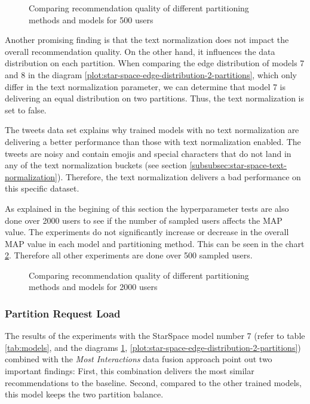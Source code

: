 \begin{figure}[!htb]
    \centering
    
    \caption{Comparing recommendation quality of different partitioning methods and models for 500 users}
    \label{plot:hyperparameter-recommendation-quality}
\end{figure}


Another promising finding is that the text normalization does not impact the overall recommendation quality. On the other hand, it influences the data distribution on each partition. When comparing the edge distribution of models 7 and 8 in the diagram \ref{plot:star-space-edge-distribution-2-partitions}, which only differ in the text normalization parameter, we can determine that model 7 is delivering an equal distribution on two partitions. Thus, the text normalization is set to false. 


The tweets data set explains why trained models with no text normalization are delivering a better performance than those with text normalization enabled. The tweets are noisy and contain emojis and special characters that do not land in any of the text normalization buckets (see section \ref{subsubsec:star-space-text-normalization}). Therefore, the text normalization delivers a bad performance on this specific dataset.


As explained in the begining of this section the hyperparameter tests are also done over 2000 users to see if the number of sampled users affects the MAP value. The experiments do not significantly increase or decrease in the overall MAP value in each model and partitioning method. This can be seen in the chart \ref{plot:hyperparameter-recommendation-quality-2000-users}. Therefore all other experiments are done over 500 sampled users.

\begin{figure}[!htb]
    \centering
    
    \caption{Comparing recommendation quality of different partitioning methods and models for 2000 users}
    \label{plot:hyperparameter-recommendation-quality-2000-users}
\end{figure}


\subsubsection{Partition Request Load}
\label{subsubsec:partition-request-load}
The results of the experiments with the StarSpace model number 7 (refer to table \ref{tab:models}, and the diagrams \ref{plot:hyperparameter-recommendation-quality}, \ref{plot:star-space-edge-distribution-2-partitions}) combined with the \emph{Most Interactions} data fusion approach point out two important findings: First, this combination delivers the most similar recommendations to the baseline. Second, compared to the other trained models, this model keeps the two partition balance.


